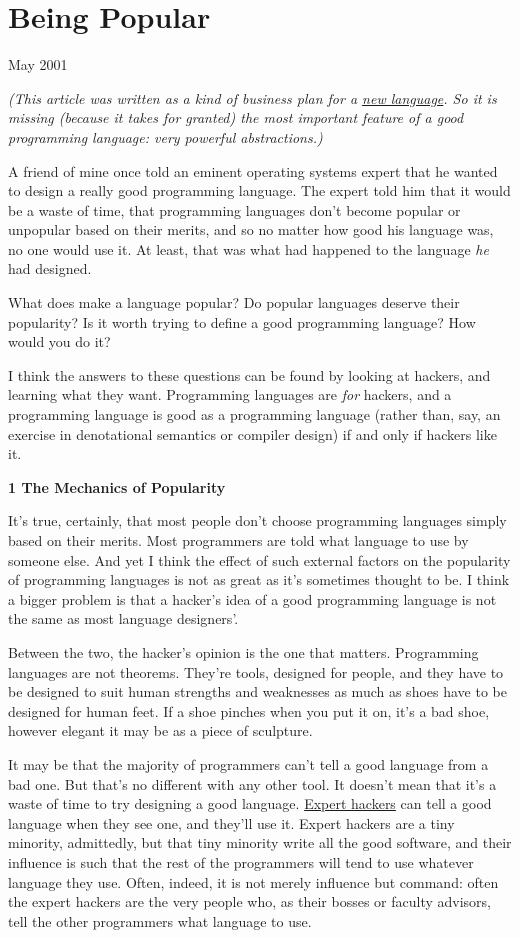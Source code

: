 \chapter{Being Popular}

May 2001

\emph{(This article was written as a kind of business plan for a
\href{arc.html}{new language}. So it is missing (because it takes for
granted) the most important feature of a good programming language: very
powerful abstractions.)}

A friend of mine once told an eminent operating systems expert that he
wanted to design a really good programming language. The expert told him
that it would be a waste of time, that programming languages don't
become popular or unpopular based on their merits, and so no matter how
good his language was, no one would use it. At least, that was what had
happened to the language \emph{he} had designed.

What does make a language popular? Do popular languages deserve their
popularity? Is it worth trying to define a good programming language?
How would you do it?

I think the answers to these questions can be found by looking at
hackers, and learning what they want. Programming languages are
\emph{for} hackers, and a programming language is good as a programming
language (rather than, say, an exercise in denotational semantics or
compiler design) if and only if hackers like it.

\textbf{1 The Mechanics of Popularity}

It's true, certainly, that most people don't choose programming
languages simply based on their merits. Most programmers are told what
language to use by someone else. And yet I think the effect of such
external factors on the popularity of programming languages is not as
great as it's sometimes thought to be. I think a bigger problem is that
a hacker's idea of a good programming language is not the same as most
language designers'.

Between the two, the hacker's opinion is the one that matters.
Programming languages are not theorems. They're tools, designed for
people, and they have to be designed to suit human strengths and
weaknesses as much as shoes have to be designed for human feet. If a
shoe pinches when you put it on, it's a bad shoe, however elegant it may
be as a piece of sculpture.

It may be that the majority of programmers can't tell a good language
from a bad one. But that's no different with any other tool. It doesn't
mean that it's a waste of time to try designing a good language.
\href{design.html}{Expert hackers} can tell a good language when they
see one, and they'll use it. Expert hackers are a tiny minority,
admittedly, but that tiny minority write all the good software, and
their influence is such that the rest of the programmers will tend to
use whatever language they use. Often, indeed, it is not merely
influence but command: often the expert hackers are the very people who,
as their bosses or faculty advisors, tell the other programmers what
language to use.

